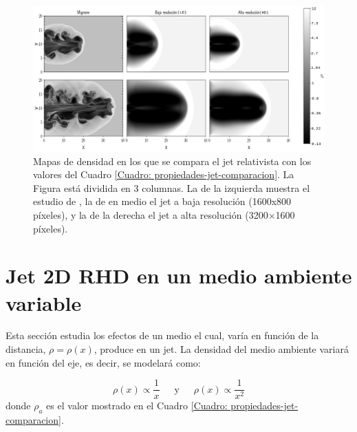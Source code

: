 \documentclass[12pt,a4paper]{book}
\begin{document}
\begin{figure}
  \centering
  \includegraphics[width=1\textwidth]{./Figuras/jet/comparacion/multiple_comparation.png}
    \caption{Mapas de densidad en los que se compara el jet relativista con los valores del Cuadro 
    \ref{Cuadro: propiedades-jet-comparacion}. La Figura está dividida en 3 columnas. La de la izquierda muestra
    el estudio de \citet{MB-HLLC-I}, la de en medio el jet a baja resolución (1600x800 píxeles), y la de la derecha el jet a alta 
    resolución (3200$\times$1600 píxeles).
    }\label{fig:comparacion_temporal_del_jet}
\end{figure}


\section{Jet 2D RHD en un medio ambiente variable} \label{sec:jet_ambiente_variable}
Esta sección estudia los efectos de un medio el cual, varía en función de la distancia, $\rho = \rho(x)$, 
produce en un jet. La densidad del medio ambiente variará en función del eje, es decir, se modelará como:

\begin{equation}
  \rho(x) \varpropto \frac{1}{x} \,\,\,\,\,\,\,\,\, \text{y} \,\,\,\,\,\,\,\,\, \rho(x) \varpropto \frac{1}{x^2}
\end{equation}
donde $\rho_a$ es el valor mostrado en el Cuadro \ref{Cuadro: propiedades-jet-comparacion}.
\end{document}
